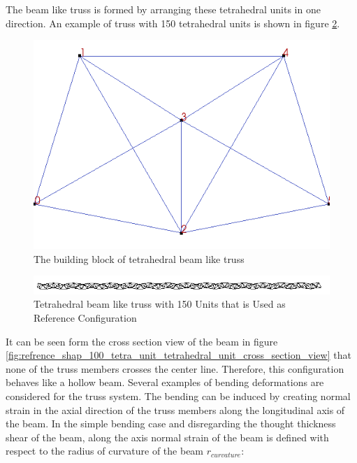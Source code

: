 The beam like truss is formed by arranging these tetrahedral units in one direction. An example of truss with 150 tetrahedral units is shown in figure \ref{fig:refrence_shap_100_tetra_unit_tetrahedral_unit}. 


\begin{figure} 
\centering
\includegraphics[width=5.0in]{./chap_5_active_trusses/images_linear_tetrahedral/building_block_of_tetrahedral_truss.png}
\caption{The building block of tetrahedral beam like truss}
\label{fig:building_block_of_tetrahedral_truss}
\end{figure} 

\begin{figure} 
\centering
\includegraphics[width=5.0in]{./chap_5_active_trusses/images_linear_tetrahedral/refrence_shap_100_tetra_unit_tetrahedral_unit.png}
\caption{Tetrahedral beam like truss with 150 Units that is Used as Reference Configuration}
\label{fig:refrence_shap_100_tetra_unit_tetrahedral_unit}
\end{figure} 



It can be seen form the cross section view of the beam in figure \ref{fig:refrence_shap_100_tetra_unit_tetrahedral_unit_cross_section_view} that none of the truss members crosses the center line. Therefore, this configuration behaves like a hollow beam. Several examples of bending deformations are considered for the truss system. The bending can be induced by creating normal strain in the axial direction of the truss members along the longitudinal axis of the beam. In the simple bending case and disregarding the thought thickness shear of the beam, along the axis normal strain of the beam is defined with respect to the radius of curvature of the beam $r_{curvature}$:

